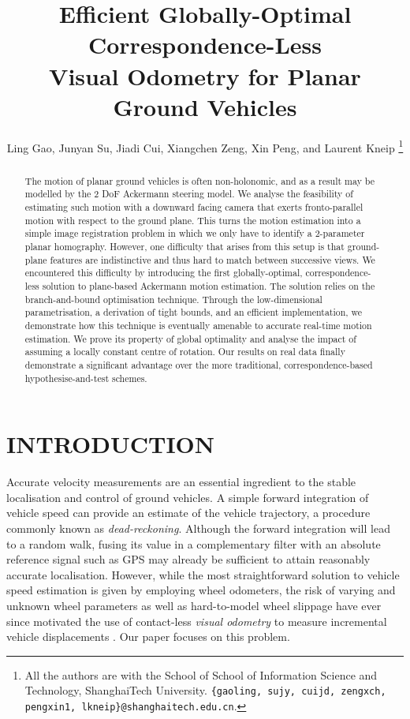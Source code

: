 \documentclass[letterpaper, 10 pt, conference]{ieeeconf}  %
\title{\LARGE \bf
Efficient Globally-Optimal Correspondence-Less\\Visual Odometry for Planar Ground Vehicles
}
\author{Ling Gao, Junyan Su, Jiadi Cui, Xiangchen Zeng, Xin Peng, and Laurent Kneip%
\thanks{All the authors are with the School of School of Information Science and Technology, ShanghaiTech University. 
{\tt\small \{gaoling, sujy, cuijd, zengxch, pengxin1, lkneip\}@shanghaitech.edu.cn}.}%
}
\begin{document}
\maketitle
\thispagestyle{empty}
\pagestyle{empty}


\begin{abstract}
The motion of planar ground vehicles is often non-holonomic, and as a result may be modelled by the 2 DoF Ackermann steering model. We analyse the feasibility of estimating such motion with a downward facing camera that exerts fronto-parallel motion with respect to the ground plane. This turns the motion estimation into a simple image registration problem in which we only have to identify a 2-parameter planar homography. However, one difficulty that arises from this setup is that ground-plane features are indistinctive and thus hard to match between successive views. We encountered this difficulty by introducing the first globally-optimal, correspondence-less solution to plane-based Ackermann motion estimation. The solution relies on the branch-and-bound optimisation technique. Through the low-dimensional parametrisation, a derivation of tight bounds, and an efficient implementation, we demonstrate how this technique is eventually amenable to accurate real-time motion estimation. We prove its property of global optimality and analyse the impact of assuming a locally constant centre of rotation. Our results on real data finally demonstrate a significant advantage over the more traditional, correspondence-based hypothesise-and-test schemes.
\end{abstract}


\section{INTRODUCTION}

Accurate velocity measurements are an essential ingredient to the stable localisation and control of ground vehicles. A simple forward integration of vehicle speed can provide an estimate of the vehicle trajectory, a procedure commonly known as \textit{dead-reckoning}. Although the forward integration will lead to a random walk, fusing its value in a complementary filter with an absolute reference signal such as GPS may already be sufficient to attain reasonably accurate localisation. However, while the most straightforward solution to vehicle speed estimation is given by employing wheel odometers, the risk of varying and unknown wheel parameters as well as hard-to-model wheel slippage have ever since motivated the use of contact-less \textit{visual odometry} to measure incremental vehicle displacements \cite{moravec80}. Our paper focuses on this problem.
\end{document}
